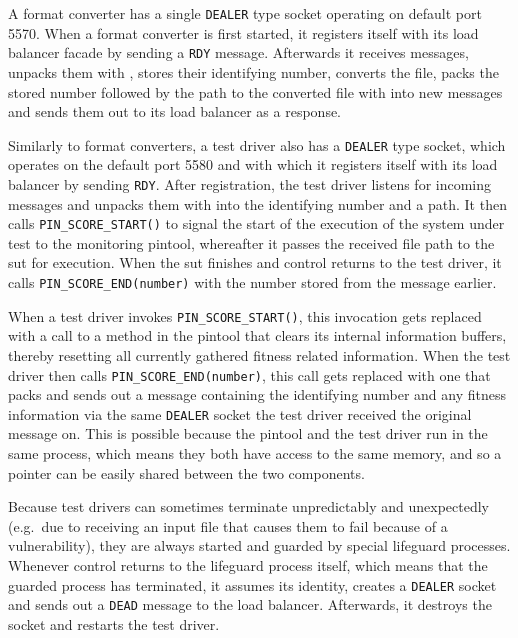 A format converter has a single \texttt{DEALER} type socket operating on default port 5570.
When a format converter is first started, it registers itself with its load balancer facade by sending a
\texttt{RDY} message. Afterwards it receives \zmq messages, unpacks them with \msgpack, stores their
identifying number, converts the file, packs the stored number followed by the path to the converted file with
\msgpack into new \zmq messages and sends them out to its load balancer as a response.

Similarly to format converters, a test driver also has a \texttt{DEALER} type socket, which operates on the
default port 5580 and with which it registers itself with its load balancer by sending \texttt{RDY}. After
registration, the test driver listens for incoming \zmq messages and unpacks them with \msgpack
into the identifying number and a path. It then calls \texttt{PIN\_SCORE\_START()} to signal the start of the
execution of the system under test to the monitoring pintool, whereafter it passes the received file path to
the sut for execution. When the sut finishes and control returns to the test driver, it calls
\texttt{PIN\_SCORE\_END(number)} with the number stored from the message earlier.

When a test driver invokes \texttt{PIN\_SCORE\_START()}, this invocation gets replaced with a call to a method
in the pintool that clears its internal information buffers, thereby resetting all currently gathered fitness
related information. When the test driver then calls \texttt{PIN\_SCORE\_END(number)}, this call gets replaced
with one that packs and sends out a message containing the identifying number and any fitness information via
the same \zmq \texttt{DEALER} socket the test driver received the original message on. This is possible
because the pintool and the test driver run in the same process, which means they both have access to the same
memory, and so a pointer can be easily shared between the two components.

Because test drivers can sometimes terminate unpredictably and unexpectedly (e.g.\ due to receiving an input
file that causes them to fail because of a vulnerability), they are always started and guarded by special
lifeguard processes. Whenever control returns to the lifeguard process itself, which means that the guarded
process has terminated, it assumes its identity, creates a \texttt{DEALER} socket and sends out a \texttt{DEAD}
message to the load balancer. Afterwards, it destroys the socket and restarts the test driver.

